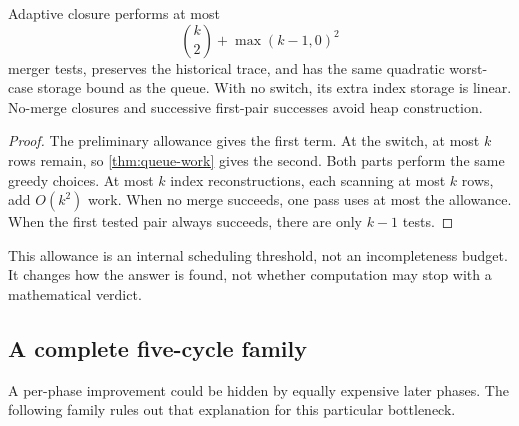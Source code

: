 \begin{corollary}
\label{cor:adaptive}
Adaptive closure performs at most
\[
 \binom{k}{2}+\max(k-1,0)^2
\]
merger tests, preserves the historical trace, and has the same quadratic
worst-case storage bound as the queue. With no switch, its extra index
storage is linear. No-merge closures and successive first-pair successes
avoid heap construction.
\end{corollary}
\begin{proof}
The preliminary allowance gives the first term. At the switch, at most
\(k\) rows remain, so \cref{thm:queue-work} gives the second.
Both parts perform the same greedy choices. At most \(k\) index
reconstructions, each scanning at most \(k\) rows, add \(O(k^2)\) work.
When no merge succeeds, one pass uses at most the allowance. When the
first tested pair always succeeds, there are only \(k-1\) tests.
\end{proof}

This allowance is an internal scheduling threshold, not an incompleteness
budget. It changes how the answer is found, not whether computation may
stop with a mathematical verdict.

\subsection{A complete five-cycle family}

A per-phase improvement could be hidden by equally expensive later
phases. The following family rules out that explanation for this
particular bottleneck.

